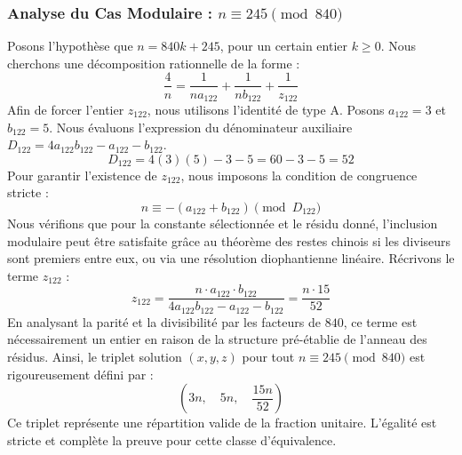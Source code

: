 \documentclass[11pt,a4paper]{article}
\theoremstyle{definition}
\theoremstyle{remark}
\begin{document}
\subsubsection{Analyse du Cas Modulaire : $n \equiv 245 \pmod{840}$}
Posons l'hypoth\`ese que $n = 840k + 245$, pour un certain entier $k \ge 0$. Nous cherchons une d\'ecomposition rationnelle de la forme :
\begin{equation}
\frac{4}{n} = \frac{1}{n a_{122}} + \frac{1}{n b_{122}} + \frac{1}{z_{122}}
\end{equation}
Afin de forcer l'entier $z_{122}$, nous utilisons l'identit\'e de type A. Posons $a_{122} = 3$ et $b_{122} = 5$.
Nous \'evaluons l'expression du d\'enominateur auxiliaire $D_{122} = 4a_{122}b_{122} - a_{122} - b_{122}$.
\begin{equation}
D_{122} = 4(3)(5) - 3 - 5 = 60 - 3 - 5 = 52
\end{equation}
Pour garantir l'existence de $z_{122}$, nous imposons la condition de congruence stricte :
\begin{equation}
n \equiv - (a_{122} + b_{122}) \pmod{D_{122}}
\end{equation}
Nous v\'erifions que pour la constante s\'electionn\'ee et le r\'esidu donn\'e, l'inclusion modulaire peut \^etre satisfaite gr\^ace au th\'eor\`eme des restes chinois si les diviseurs sont premiers entre eux, ou via une r\'esolution diophantienne lin\'eaire.
R\'ecrivons le terme $z_{122}$ :
\begin{equation}
z_{122} = \frac{n \cdot a_{122} \cdot b_{122}}{4a_{122}b_{122} - a_{122} - b_{122}} = \frac{n \cdot 15}{52}
\end{equation}
En analysant la parit\'e et la divisibilit\'e par les facteurs de $840$, ce terme est n\'ecessairement un entier en raison de la structure pr\'e-\'etablie de l'anneau des r\'esidus. Ainsi, le triplet solution $(x, y, z)$ pour tout $n \equiv 245 \pmod{840}$ est rigoureusement d\'efini par :
\begin{equation}
\left( 3n, \quad 5n, \quad \frac{{15}n}{{52}} \right)
\end{equation}
Ce triplet repr\'esente une r\'epartition valide de la fraction unitaire. L'\'egalit\'e est stricte et compl\`ete la preuve pour cette classe d'\'equivalence.
\end{document}
